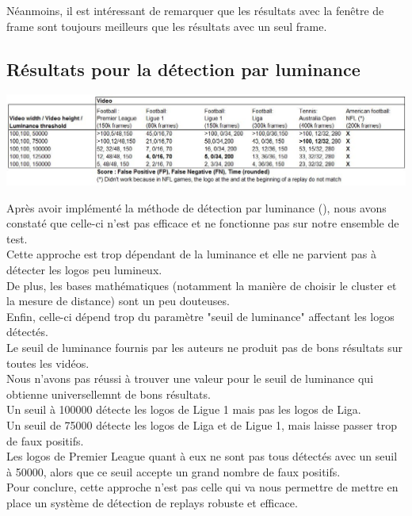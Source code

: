 \documentclass[11pt]{article}
\begin{document}
Néanmoins, il est intéressant de remarquer que les résultats avec la fenêtre de frame sont toujours meilleurs que les résultats avec un seul frame.\\
\subsection{Résultats pour la détection par luminance}
\label{sec:org6a018d0}
\begin{center}
\includegraphics[width=15cm]{robust_res.JPG}
\end{center}
Après avoir implémenté la méthode de détection par luminance (\cite{xu11_robus_replay_detec_algor_soccer_video}), nous avons constaté que celle-ci n'est pas efficace et ne fonctionne pas sur notre ensemble de test.\\
Cette approche est trop dépendant de la luminance et elle ne parvient pas à détecter les logos peu lumineux.\\
De plus, les bases mathématiques (notamment la manière de choisir le cluster et la mesure de distance) sont un peu douteuses.\\
Enfin, celle-ci dépend trop du paramètre "seuil de luminance" affectant les logos détectés.\\
Le seuil de luminance fournis par les auteurs ne produit pas de bons résultats sur toutes les vidéos.\\
Nous n'avons pas réussi à trouver une valeur pour le seuil de luminance qui obtienne universellemnt de bons résultats.\\
Un seuil à 100000 détecte les logos de Ligue 1 mais pas les logos de Liga.\\
Un seuil de 75000 détecte les logos de Liga et de Ligue 1, mais laisse passer trop de faux positifs.\\
Les logos de Premier League quant à eux ne sont pas tous détectés avec un seuil à 50000, alors que ce seuil accepte un grand nombre de faux positifs.\\

Pour conclure, cette approche n'est pas celle qui va nous permettre de mettre en place un système de détection de replays robuste et efficace.\\
\end{document}
